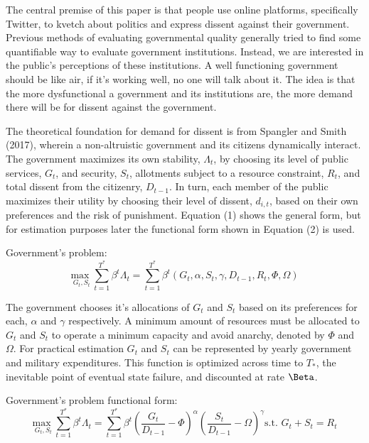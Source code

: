 \documentclass[12pt]{article}
\begin{document}
\begin{spacing}{1.5}
The central premise of this paper is that people use online platforms, specifically Twitter, to kvetch about politics and express dissent against their government. Previous methods of evaluating governmental quality generally tried to find some quantifiable way to evaluate government institutions. Instead, we are interested in the public's perceptions of these institutions. A well functioning government should be like air, if it's working well, no one will talk about it. The idea is that the more dysfunctional a government and its institutions are, the more demand there will be for dissent against the government.

The theoretical foundation for demand for dissent is from Spangler and Smith (2017), wherein a non-altruistic government and its citizens dynamically interact. The government maximizes its own stability, $\Lambda_t$, by choosing its level of public services, $G_t$, and security, $S_t$, allotments subject to a resource constraint, $R_t$, and total dissent from the citizenry, $D_{t-1}$. In turn, each member of the public maximizes their utility by choosing their level of dissent, $d_{i,t}$, based on their own preferences and the risk of punishment. Equation (1) shows the general form, but for estimation purposes later the functional form shown in Equation (2) is used.   

\vspace{.5 em}

\noindent Government's problem:
\begin{equation}
{\underset{G_t,S_t}{\text{max }}} \sum\limits_{t=1}^{T^*} \beta^t {\Lambda}_t = \sum\limits_{t=1}^{T^*} \beta^t\left(G_t,\alpha, S_t,\gamma ,D_{t-1},R_t,\Phi,\Omega \right)   
\end{equation}



The government chooses it's allocations of $G_t$ and $S_t$ based on its preferences for each, $\alpha$ and $\gamma$ respectively. A minimum amount of resources must be allocated to $G_t$ and $S_t$ to operate a minimum capacity and avoid anarchy, denoted by $\Phi$ and $\Omega$. For practical estimation $G_t$ and $S_t$ can be represented by yearly government and military expenditures. This function is optimized across time to $T_*$, the inevitable point of eventual state failure, and discounted at rate $\Beta$.  

\vspace{.5 em}

\noindent Government's problem functional form:
\begin{equation}
{\underset{G_t,S_t}{\text{max }}} \sum\limits_{t=1}^{T^*} \beta^t {\Lambda}_t = \sum\limits_{t=1}^{T^*} \beta^t\left(\frac{G_t}{D_{t-1}}-\Phi\right)^\alpha \left(\frac{S_t}{D_{t-1}}-\Omega\right)^\gamma   \text{s.t. } G_t+S_t=R_t
\end{equation}


\end{spacing}
\end{document}
